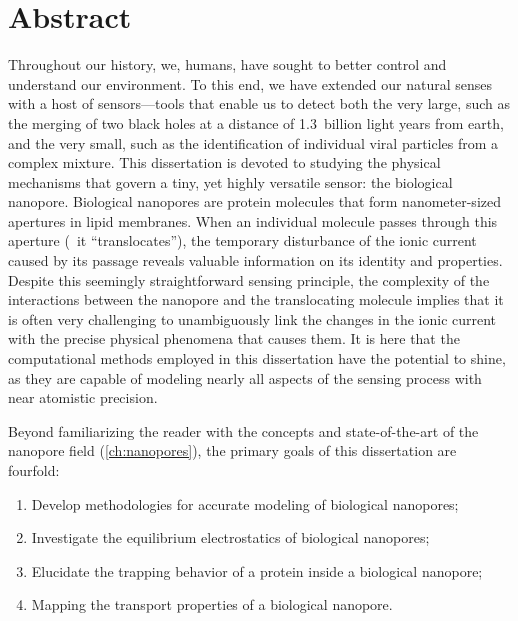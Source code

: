 \chapter{Abstract}
%
\label{ch:abstract}
%

Throughout our history, we, humans, have sought to better control and understand our environment. To this end,
we have extended our natural senses with a host of sensors---tools that enable us to detect both the very
large, such as the merging of two black holes at a distance of \num{1.3}~billion light years from earth, and
the very small, such as the identification of individual viral particles from a complex mixture. This
dissertation is devoted to studying the physical mechanisms that govern a tiny, yet highly versatile sensor:
the biological nanopore. Biological nanopores are protein molecules that form nanometer-sized apertures in
lipid membranes. When an individual molecule passes through this aperture (\ie~it ``translocates''), the
temporary disturbance of the ionic current caused by its passage reveals valuable information on its identity
and properties. Despite this seemingly straightforward sensing principle, the complexity of the interactions
between the nanopore and the translocating molecule implies that it is often very challenging to unambiguously
link the changes in the ionic current with the precise physical phenomena that causes them. It is here that
the computational methods employed in this dissertation have the potential to shine, as they are capable of
modeling nearly all aspects of the sensing process with near atomistic precision.

Beyond familiarizing the reader with the concepts and state-of-the-art of the nanopore field
(\cref{ch:nanopores}), the primary goals of this dissertation are fourfold:
%
\begin{enumerate}
  \item Develop methodologies for accurate modeling of biological nanopores;
  \item Investigate the equilibrium electrostatics of biological nanopores;
  \item Elucidate the trapping behavior of a protein inside a biological nanopore;
  \item Mapping the transport properties of a biological nanopore.
\end{enumerate}
%

